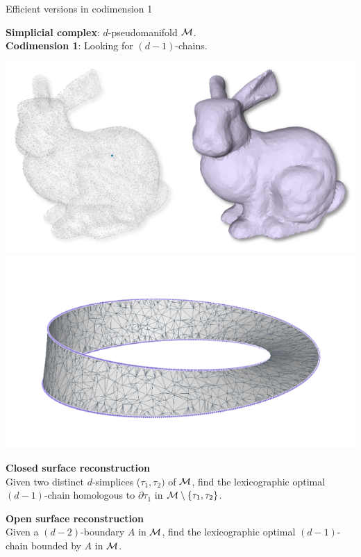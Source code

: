 \begin{frame}{Efficient versions in codimension 1}
\scriptsize

\textbf{Simplicial complex}: $d$-pseudomanifold $\mathcal{M}$.\\
\textbf{Codimension 1}: Looking for $(d-1)$-chains.
\vspace{0.2cm}

\pause

\includegraphics[width=0.47\linewidth]{applications/bunny}%
\hfill
\includegraphics[width=0.47\linewidth]{applications/mobius}
\vspace{0.2cm}

\begin{minipage}{0.47\linewidth}
\textbf{Closed surface reconstruction}\\
Given two distinct $d$-simplices ($\tau_1, \tau_2)$ of $\mathcal{M}$, find the lexicographic optimal $(d-1)$-chain homologous to $\partial\tau_1$ in $\mathcal{M} \setminus \{ \tau_1, \tau_2 \}$.
\end{minipage}%
\hfill
\begin{minipage}{0.47\linewidth}
\textbf{Open surface reconstruction}\\
Given a $(d-2)$-boundary $A$ in $\mathcal{M}$, find the lexicographic optimal $(d-1)$-chain bounded by $A$ in $\mathcal{M}$.
\end{minipage}
\end{frame}


